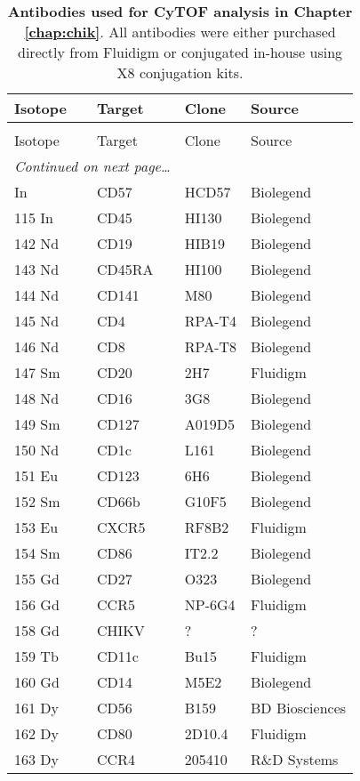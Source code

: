 \begin{flushleft}
\begin{longtable}[c]{l l l l}
    \toprule
    Isotope & Target & Clone & Source \\
    \midrule
  \endhead
    \caption[Antibodies used for CyTOF analysis in Chapter \ref{chap:chik}]{
      \textbf{Antibodies used for CyTOF analysis in Chapter \ref{chap:chik}}. All antibodies were either purchased directly from Fluidigm or conjugated in-house using X8 conjugation kits. 
    }
    \\
    \toprule
    Isotope & Target & Clone & Source \\
    \midrule
  \endfirsthead
    \midrule
    \multicolumn{2}{r}{\textit{Continued on next page\ldots}} \\
  \endfoot
    \bottomrule
  \endlastfoot
    113 In & CD57 & HCD57 & Biolegend \\
    115 In & CD45 & HI130 & Biolegend \\
    142 Nd & CD19 & HIB19 & Biolegend \\
    143 Nd & CD45RA & HI100 & Biolegend \\
    144 Nd & CD141 & M80 & Biolegend \\
    145 Nd & CD4 & RPA-T4 & Biolegend \\
    146 Nd & CD8 & RPA-T8 & Biolegend \\
    147 Sm & CD20 & 2H7 & Fluidigm \\
    148 Nd & CD16 & 3G8 & Biolegend \\
    149 Sm & CD127 & A019D5 & Biolegend \\
    150 Nd & CD1c & L161 & Biolegend \\
    151 Eu & CD123 & 6H6 & Biolegend \\
    152 Sm & CD66b & G10F5 & Biolegend \\
    153 Eu & CXCR5 & RF8B2 & Fluidigm \\
    154 Sm & CD86 & IT2.2 & Biolegend \\
    155 Gd & CD27 & O323 & Biolegend \\
    156 Gd & CCR5 & NP-6G4 & Fluidigm \\
    158 Gd & CHIKV & ? & ? \\
    159 Tb & CD11c & Bu15 & Fluidigm \\
    160 Gd & CD14 & M5E2 & Biolegend \\
    161 Dy & CD56 & B159 & BD Biosciences \\
    162 Dy & CD80 & 2D10.4 & Fluidigm \\
    163 Dy & CCR4 & 205410 & R\&D Systems \\

\end{longtable}
\end{flushleft}
